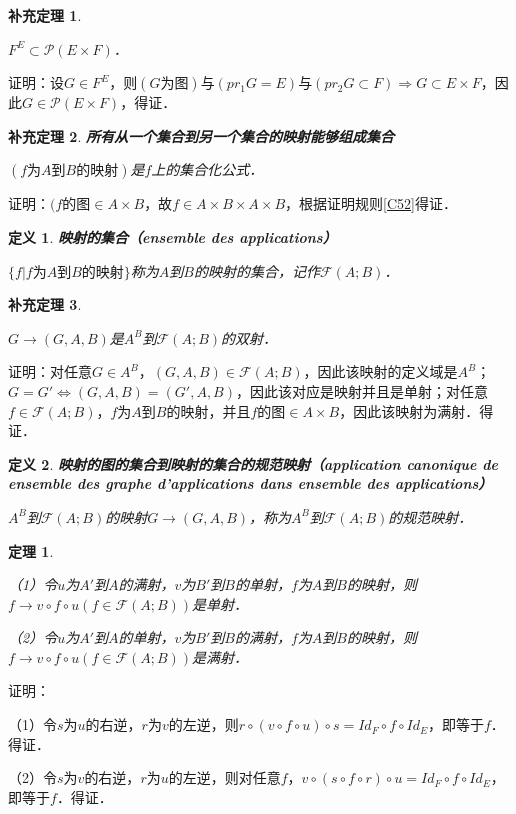 \documentclass[12pt, a4paper, oneside]{book}
\newtheorem{theo}{定理}
\newtheorem{cor}{补充定理}
\newtheorem{de}{定义}
\begin{document}
			\begin{cor}\label{cor121}
				\hfill\par
				$F^E\subset \mathcal{P}(E\times F)$．
			\end{cor}
			证明：设$G\in F^E$，则$(G\text{为图})\text{与}(pr_1G=E)\text{与}(pr_2G\subset F)\Rightarrow G\subset E\times F$，因此$G\in \mathcal{P}(E\times F)$，得证．
						
			\begin{cor}\label{cor122}
				\textbf{所有从一个集合到另一个集合的映射能够组成集合}
				\par
				$(f\text{为}A\text{到}B\text{的映射})$是$f$上的集合化公式．
			\end{cor}
			证明：$(f\text{的图}\in A\times B$，故$f\in A\times B\times A\times B$，根据证明规则\ref{C52}得证．
			
			\begin{de}
				\textbf{映射的集合（ensemble des applications）}
				\par
				$\{f|f\textbf{为}A\text{到}B\text{的映射}\}$称为$A$到$B$的映射的集合，记作$\mathcal{F}(A; B)$．
			\end{de}
							
			\begin{cor}\label{cor123}
				\hfill\par
				$G\to (G, A, B)$是$A^B$到$\mathcal{F}(A; B)$的双射．
			\end{cor}
			证明：对任意$G\in A^B$，$(G, A, B)\in \mathcal{F}(A; B)$，因此该映射的定义域是$A^B$；$G=G'\Leftrightarrow (G, A, B)=(G', A, B)$，因此该对应是映射并且是单射；对任意$f\in \mathcal{F}(A; B)$，$f$为$A$到$B$的映射，并且$f\text{的图}\in A\times B$，因此该映射为满射．得证．

			\begin{de}
				\textbf{映射的图的集合到映射的集合的规范映射（application canonique de ensemble des graphe d'applications dans ensemble des applications）}
				\par
				$A^B$到$\mathcal{F}(A; B)$的映射$G\to (G, A, B)$，称为$A^B$到$\mathcal{F}(A; B)$的规范映射．
			\end{de}
						
			\begin{theo}\label{theo37}
				\hfill\par
				（1）令$u$为$A'$到$A$的满射，$v$为$B'$到$B$的单射，$f$为$A$到$B$的映射，则$f\to v\circ f\circ u(f\in \mathcal{F}(A; B))$是单射．
				\par
				（2）令$u$为$A'$到$A$的单射，$v$为$B'$到$B$的满射，$f$为$A$到$B$的映射，则$f\to v\circ f\circ u(f\in \mathcal{F}(A; B))$是满射．
			\end{theo}
			证明：
			\par
			（1）令$s$为$u$的右逆，$r$为$v$的左逆，则$r\circ (v\circ f\circ u)\circ s=Id_F\circ f\circ Id_E$，即等于$f$．得证．
			\par
			（2）令$s$为$v$的右逆，$r$为$u$的左逆，则对任意$f$，$v\circ (s\circ f\circ r)\circ u=Id_F\circ f\circ Id_E$，即等于$f$．得证．
						
\end{document}
